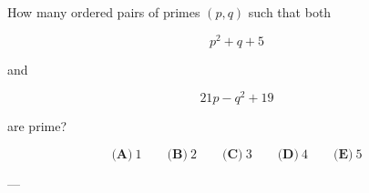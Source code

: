 How many ordered pairs of primes \((p,q)\) such that both



\[
p^2+q+5
\]

and



\[
21p-q^2+19
\]

are prime?



\[
\textbf{(A)}\ 1
\qquad
\textbf{(B)}\ 2
\qquad
\textbf{(C)}\ 3
\qquad
\textbf{(D)}\ 4
\qquad
\textbf{(E)}\ 5
\]

---
